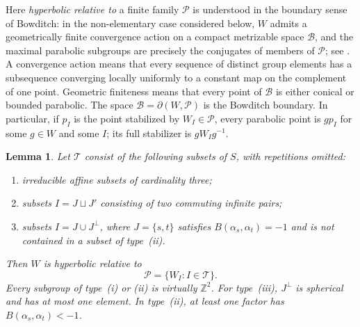 \documentclass[11pt,reqno]{amsart}
\theoremstyle{plain}
\newtheorem{lemma}[theorem]{Lemma}
\theoremstyle{definition}
\theoremstyle{remark}
\numberwithin{equation}{section}
\begin{document}
\noindent
Here \emph{hyperbolic relative to} a finite family $\mathcal P$
is understood in the boundary sense of Bowditch: in the non-elementary
case considered below, $W$ admits a geometrically finite convergence
action on a compact metrizable space $\mathcal B$, and the maximal
parabolic subgroups are precisely the conjugates of members of
$\mathcal P$; see \cite{Bowditch}.
A convergence action means that every sequence of distinct group
elements has a subsequence converging locally uniformly to a constant
map on the complement of one point.
Geometric finiteness means that every point of $\mathcal B$ is either
conical or bounded parabolic.
The space $\mathcal B=\partial(W,\mathcal P)$ is the Bowditch boundary.
In particular, if $p_I$ is the point stabilized by $W_I\in\mathcal P$,
every parabolic point is $g p_I$ for some $g\in W$ and some $I$;
its full stabilizer is $gW_Ig^{-1}$.

\begin{lemma}\label{lem:32-peripherals}
Let $\mathcal T$ consist of the following subsets of $S$,
with repetitions omitted:
\begin{enumerate}[label=(\roman*)]
    \item irreducible affine subsets of cardinality three;
    \item subsets $I=J\sqcup J'$ consisting of two commuting
    infinite pairs;
    \item subsets $I=J\cup J^\perp$, where
    $J=\{s,t\}$ satisfies $B(\alpha_s,\alpha_t)=-1$
    and is not contained in a subset of type~\textup{(ii)}.
\end{enumerate}
Then $W$ is hyperbolic relative to
\[
    \mathcal P=\{W_I:I\in\mathcal T\}.
\]
Every subgroup of type~\textup{(i)} or \textup{(ii)}
is virtually $\mathbb Z^2$.
For type~\textup{(iii)}, $J^\perp$ is spherical and has
at most one element.
In type~\textup{(ii)}, at least one factor has
$B(\alpha_s,\alpha_t)<-1$.
\end{lemma}
\end{document}
